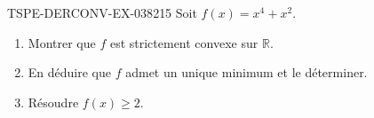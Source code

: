 \begin{exercice}{TSPE-DERCONV-EX-038}{2}{15}
Soit $f(x) = x^4 + x^2$.
\begin{enumerate}
  \item Montrer que $f$ est strictement convexe sur $\mathbb{R}$.
  \item En déduire que $f$ admet un unique minimum et le déterminer.
  \item Résoudre $f(x) \geq 2$.
\end{enumerate}

\end{exercice}
